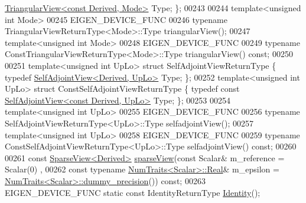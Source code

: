 \begin{DoxyCode}
      \hyperlink{group___core___module_class_eigen_1_1_triangular_view}{TriangularView<const Derived, Mode>} Type; \};
00243 
00244     \textcolor{keyword}{template}<\textcolor{keywordtype}{unsigned} \textcolor{keywordtype}{int} Mode>
00245     EIGEN\_DEVICE\_FUNC
00246     \textcolor{keyword}{typename} TriangularViewReturnType<Mode>::Type triangularView();
00247     \textcolor{keyword}{template}<\textcolor{keywordtype}{unsigned} \textcolor{keywordtype}{int} Mode>
00248     EIGEN\_DEVICE\_FUNC
00249     \textcolor{keyword}{typename} ConstTriangularViewReturnType<Mode>::Type triangularView() \textcolor{keyword}{const};
00250 
00251     \textcolor{keyword}{template}<\textcolor{keywordtype}{unsigned} \textcolor{keywordtype}{int} UpLo> \textcolor{keyword}{struct }SelfAdjointViewReturnType \{ \textcolor{keyword}{typedef} 
      \hyperlink{group___core___module_class_eigen_1_1_self_adjoint_view}{SelfAdjointView<Derived, UpLo>} Type; \};
00252     \textcolor{keyword}{template}<\textcolor{keywordtype}{unsigned} \textcolor{keywordtype}{int} UpLo> \textcolor{keyword}{struct }ConstSelfAdjointViewReturnType \{ \textcolor{keyword}{typedef} \textcolor{keyword}{const} 
      \hyperlink{group___core___module_class_eigen_1_1_self_adjoint_view}{SelfAdjointView<const Derived, UpLo>} Type; \};
00253 
00254     \textcolor{keyword}{template}<\textcolor{keywordtype}{unsigned} \textcolor{keywordtype}{int} UpLo>
00255     EIGEN\_DEVICE\_FUNC
00256     \textcolor{keyword}{typename} SelfAdjointViewReturnType<UpLo>::Type selfadjointView();
00257     \textcolor{keyword}{template}<\textcolor{keywordtype}{unsigned} \textcolor{keywordtype}{int} UpLo>
00258     EIGEN\_DEVICE\_FUNC
00259     \textcolor{keyword}{typename} ConstSelfAdjointViewReturnType<UpLo>::Type selfadjointView() \textcolor{keyword}{const};
00260 
00261     \textcolor{keyword}{const} \hyperlink{group___sparse_core___module_class_eigen_1_1_sparse_view}{SparseView<Derived>} \hyperlink{group___sparse_core___module_ga320dd291cbf4339c6118c41521b75350}{sparseView}(\textcolor{keyword}{const} Scalar& m\_reference = Scalar(0)
      ,
00262                                          \textcolor{keyword}{const} \textcolor{keyword}{typename} \hyperlink{group___core___module_struct_eigen_1_1_num_traits}{NumTraits<Scalar>::Real}& 
      m\_epsilon = \hyperlink{group___core___module_struct_eigen_1_1_num_traits}{NumTraits<Scalar>::dummy\_precision}()) \textcolor{keyword}{const};
00263     EIGEN\_DEVICE\_FUNC \textcolor{keyword}{static} \textcolor{keyword}{const} IdentityReturnType \hyperlink{group___core___module_a2ef43190f3aba0aef0cf1030d46d0ca7}{Identity}();

\end{DoxyCode}
